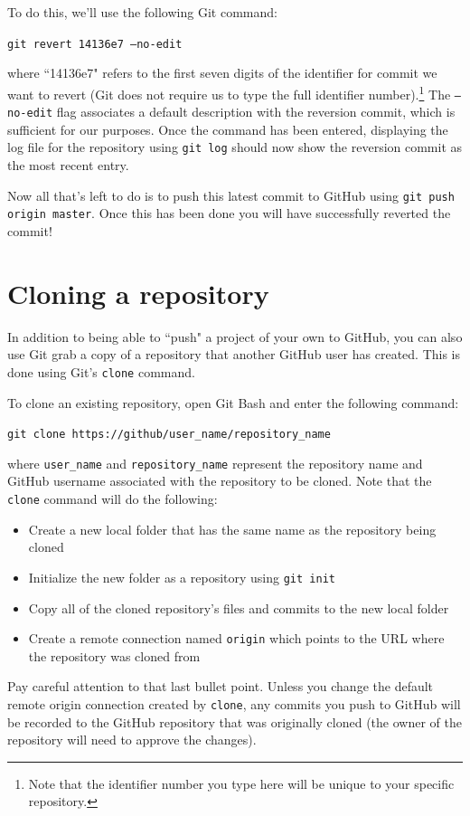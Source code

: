 \documentclass{book}
\begin{document}
 To do this, we'll use the following Git command:
 
 \texttt {git revert 14136e7 --no-edit}
 
 where ``14136e7" refers to the first seven digits of the identifier for commit we want to revert (Git does not require us to type the full identifier number).\footnote{Note that the identifier number you type here will be unique to your specific repository.} The \texttt{--no-edit} flag associates a default description with the reversion commit, which is sufficient for our purposes. Once the command has been entered, displaying the log file for the repository using \texttt{git log} should now show the reversion commit as the most recent entry.
 
 Now all that's left to do is to push this latest commit to GitHub using \texttt{git push origin master}. Once this has been done you will have successfully reverted the commit!

\section{Cloning a repository}
In addition to being able to ``push" a project of your own to GitHub, you can also use Git grab a copy of a repository that another GitHub user has created. This is done using Git's \texttt{clone} command.

To clone an existing repository, open Git Bash and enter the following command:

\texttt{git clone https://github/user\_name/repository\_name}

where \texttt{user\_name} and \texttt{repository\_name} represent the repository name and GitHub username associated with the repository to be cloned. Note that the \texttt{clone} command will do the following:

\begin{itemize}
	\item Create a new local folder that has the same name as the repository being cloned
	\item Initialize the new folder as a repository using \texttt{git init}
	\item Copy all of the cloned repository's files and commits to the new local folder
	\item Create a remote connection named \texttt{origin} which points to the URL where the repository was cloned from
\end{itemize}

Pay careful attention to that last bullet point. Unless you change the default remote origin connection created by \texttt{clone}, any commits you push to GitHub will be recorded to the GitHub repository that was originally cloned (the owner of the repository will need to approve the changes). 
\end{document}
